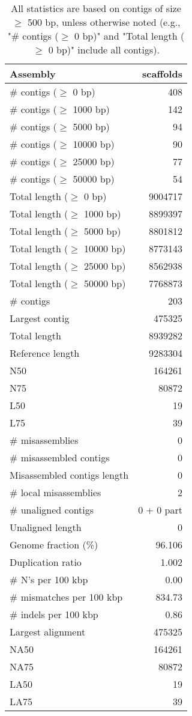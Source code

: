 \documentclass[12pt,a4paper]{article}
\begin{document}
\begin{table}[ht]
\begin{center}
\caption{All statistics are based on contigs of size $\geq$ 500 bp, unless otherwise noted (e.g., "\# contigs ($\geq$ 0 bp)" and "Total length ($\geq$ 0 bp)" include all contigs).}
\begin{tabular}{|l*{1}{|r}|}
\hline
Assembly & scaffolds \\ \hline
\# contigs ($\geq$ 0 bp) & 408 \\ \hline
\# contigs ($\geq$ 1000 bp) & 142 \\ \hline
\# contigs ($\geq$ 5000 bp) & 94 \\ \hline
\# contigs ($\geq$ 10000 bp) & 90 \\ \hline
\# contigs ($\geq$ 25000 bp) & 77 \\ \hline
\# contigs ($\geq$ 50000 bp) & 54 \\ \hline
Total length ($\geq$ 0 bp) & 9004717 \\ \hline
Total length ($\geq$ 1000 bp) & 8899397 \\ \hline
Total length ($\geq$ 5000 bp) & 8801812 \\ \hline
Total length ($\geq$ 10000 bp) & 8773143 \\ \hline
Total length ($\geq$ 25000 bp) & 8562938 \\ \hline
Total length ($\geq$ 50000 bp) & 7768873 \\ \hline
\# contigs & 203 \\ \hline
Largest contig & 475325 \\ \hline
Total length & 8939282 \\ \hline
Reference length & 9283304 \\ \hline
N50 & 164261 \\ \hline
N75 & 80872 \\ \hline
L50 & 19 \\ \hline
L75 & 39 \\ \hline
\# misassemblies & 0 \\ \hline
\# misassembled contigs & 0 \\ \hline
Misassembled contigs length & 0 \\ \hline
\# local misassemblies & 2 \\ \hline
\# unaligned contigs & 0 + 0 part \\ \hline
Unaligned length & 0 \\ \hline
Genome fraction (\%) & 96.106 \\ \hline
Duplication ratio & 1.002 \\ \hline
\# N's per 100 kbp & 0.00 \\ \hline
\# mismatches per 100 kbp & 834.73 \\ \hline
\# indels per 100 kbp & 0.86 \\ \hline
Largest alignment & 475325 \\ \hline
NA50 & 164261 \\ \hline
NA75 & 80872 \\ \hline
LA50 & 19 \\ \hline
LA75 & 39 \\ \hline
\end{tabular}
\end{center}
\end{table}
\end{document}
